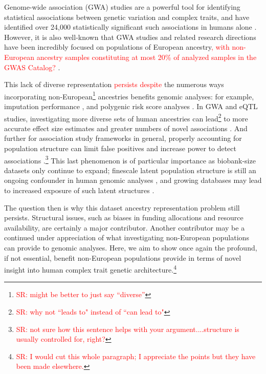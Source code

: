 \documentclass[12pt,a4paper]{article}
\newcommand{\red}[1]{\textcolor{red}{#1}}
\begin{document}
Genome-wide association (GWA) studies are a powerful tool for identifying statistical associations between genetic variation and complex traits, and have identified over 24,000 statistically significant such associations in humans alone \citep{Buniello2019}. However, it is also well-known that GWA studies and related research directions have been incredibly focused on populations of European ancestry\red{, with non-European ancestry samples constituting at most 20\% of analyzed samples in the GWAS Catalog?} \citep{Need2009,Popejoy2016,Gurdasani2019,Martin2019,Sirugo2019}.

This lack of diverse representation \red{persists despite} the numerous ways incorporating non-European\footnote{\red{SR: might be better to just say ``diverse''}} ancestries benefits genomic analyses: for example, imputation performance \citep{Huang2009,Howie2011,Das2018,Kowalski2019}, and polygenic risk score analyses \citep{Martin2017a,Duncan2019,Kerminen2019,Rosenberg2019,Marnetto2020,Mostafavi2020}. In GWA and eQTL studies, investigating more diverse sets of human ancestries can lead\footnote{\red{SR: why not ``leads to" instead of ``can lead to"}} to more accurate effect size estimates and greater numbers of novel associations \citep{Dumitrescu2011,Stranger2012,Carlson2013,Bien2019,Mogil2018,Gurdasani2019,Kuchenbaecker2019,Wojcik2019,Zhong2019}. And further for association study frameworks in general, properly accounting for population structure can limit false positives and increase power to detect associations \citep{Kang2010,Price2010,Zhou2012,Sul2018}.\footnote{\red{SR: not sure how this sentence helps with your argument....structure is usually controlled for, right?}} This last phenomenon is of particular importance as biobank-size datasets only continue to expand; finescale latent population structure is still an ongoing confounder in human genomic analyses \citep{Berg2019,Sohail2019,Lawson2020}, and growing databases may lead to increased exposure of such latent structures \citep{Haworth2019,Dai2020,Sakaue2020,Lawson2020}. 

The question then is why this dataset ancestry representation problem still persists. Structural issues, such as biases in funding allocations and resource availability, are certainly a major contributor. Another contributor may be a continued under appreciation of what investigating non-European populations can provide to genomic analyses. Here, we aim to show once again the profound, if not essential, benefit non-European populations provide in terms of novel insight into human complex trait genetic architecture.\footnote{\red{SR: I would cut this whole paragraph; I appreciate the points but they have been made elsewhere.}}
\end{document}
